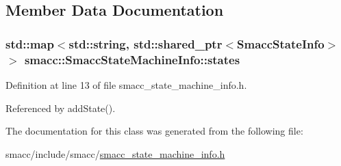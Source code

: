 \subsection{Member Data Documentation}
\subsubsection[{\texorpdfstring{states}{states}}]{\setlength{\rightskip}{0pt plus 5cm}std\+::map$<$std\+::string, std\+::shared\+\_\+ptr$<${\bf Smacc\+State\+Info}$>$ $>$ smacc\+::\+Smacc\+State\+Machine\+Info\+::states}\hypertarget{classsmacc_1_1SmaccStateMachineInfo_a8d6f1a9ce60f39835e7aa2179139977f}{}\label{classsmacc_1_1SmaccStateMachineInfo_a8d6f1a9ce60f39835e7aa2179139977f}


Definition at line 13 of file smacc\+\_\+state\+\_\+machine\+\_\+info.\+h.



Referenced by add\+State().



The documentation for this class was generated from the following file\+:\begin{DoxyCompactItemize}
\item 
smacc/include/smacc/\hyperlink{smacc__state__machine__info_8h}{smacc\+\_\+state\+\_\+machine\+\_\+info.\+h}\end{DoxyCompactItemize}
